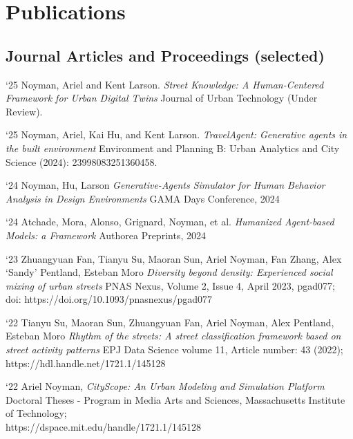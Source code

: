 \section*{Publications}

\subsection*{Journal Articles and Proceedings (selected)}

\begin{tablist}

    \item[`25] \tab
    Noyman, Ariel and Kent Larson.
    \textit{Street Knowledge: A Human-Centered Framework for Urban Digital Twins}
    Journal of Urban Technology (Under Review).


    \item[`25] \tab
    Noyman, Ariel, Kai Hu, and Kent Larson.
    \textit{TravelAgent: Generative agents in the built environment}
    Environment and Planning B: Urban Analytics and City Science (2024): 23998083251360458.

    \item[`24] \tab
    Noyman, Hu, Larson
    \textit{Generative-Agents Simulator for Human Behavior Analysis in Design Environments}
    GAMA Days Conference, 2024

    \item[`24] \tab
    Atchade, Mora, Alonso, Grignard, Noyman, et al.
    \textit{Humanized Agent-based Models: a Framework}
    Authorea Preprints, 2024


    \item[`23] \tab
    Zhuangyuan Fan, Tianyu Su, Maoran Sun, Ariel Noyman, Fan Zhang, Alex ‘Sandy’ Pentland, Esteban Moro
    \textit{Diversity beyond density: Experienced social mixing of urban streets}
    PNAS Nexus, Volume 2, Issue 4, April 2023, pgad077; doi: https://doi.org/10.1093/pnasnexus/pgad077

    \item[`22] \tab
    Tianyu Su, Maoran Sun, Zhuangyuan Fan, Ariel Noyman, Alex Pentland, Esteban Moro
    \textit{Rhythm of the streets: A street classification framework based on street activity patterns}
    EPJ Data Science volume 11, Article number: 43 (2022); https://hdl.handle.net/1721.1/145128


    \item[`22] \tab
    Ariel Noyman,
    \textit{CityScope: An Urban Modeling and Simulation Platform}
    Doctoral Theses - Program in Media Arts and Sciences,
    Massachusetts Institute of Technology; \\https://dspace.mit.edu/handle/1721.1/145128


\end{tablist}
